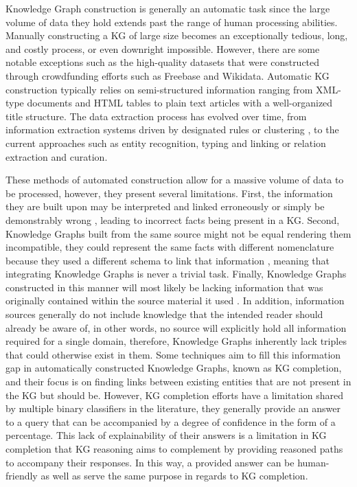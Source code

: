 Knowledge Graph construction is generally an automatic task since the large volume of data they hold extends past the range of human processing abilities. Manually constructing a KG of large size becomes an exceptionally tedious, long, and costly process, or even downright impossible. However, there are some notable exceptions such as the high-quality datasets that were constructed through crowdfunding efforts such as Freebase\cite{bollacker2007freebase} and Wikidata\cite{vrandevcic2014wikidata}. Automatic KG construction typically relies on semi-structured\cite{lehmann2015dbpedia} information ranging from XML-type documents and HTML tables to plain text articles with a well-organized title structure.
The data extraction process has evolved over time, from information extraction systems driven by designated rules or clustering \cite{yates2007textrunner, etzioni2004web}, to the current approaches such as entity recognition\cite{huang2015bidirectional, ma2016end}, typing\cite{xu2018neural, ren2016label} and linking\cite{ganea2017deep, le2018improving} or relation extraction and curation\cite{zeng2015distant, zhou2016attention}. 

These methods of automated construction allow for a massive volume of data to be processed, however, they present several limitations.
First, the information they are built upon may be interpreted and linked erroneously or simply be demonstrably wrong \cite{martinez2020information}, leading to incorrect facts being present in a KG. 
Second, Knowledge Graphs built from the same source might not be equal rendering them incompatible, they could represent the same facts with different nomenclature because they used a different schema to link that information \cite{choi2006survey}, meaning that integrating Knowledge Graphs is never a trivial task.
Finally, Knowledge Graphs constructed in this manner will most likely be lacking information that was originally contained within the source material it used \cite{bordes2014constructing}. In addition, information sources generally do not include knowledge that the intended reader should already be aware of, in other words, no source will explicitly hold all information required for a single domain, therefore, Knowledge Graphs inherently lack triples that could otherwise exist in them.
Some techniques aim to fill this information gap in automatically constructed Knowledge Graphs, known as KG completion, and their focus is on finding links between existing entities that are not present in the KG but should be. However, KG completion efforts have a limitation shared by multiple binary classifiers in the literature, they generally provide an answer to a query that can be accompanied by a degree of confidence in the form of a percentage. This lack of explainability of their answers is a limitation in KG completion that KG reasoning aims to complement by providing reasoned paths to accompany their responses. In this way, a provided answer can be human-friendly as well as serve the same purpose in regards to KG completion.

